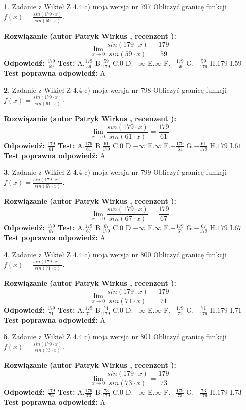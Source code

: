 \documentclass[12pt, a4paper]{article}
\theoremstyle{definition} %
\newtheorem{zad}{}
\newcommand{\zadStart}[1]{\begin{zad}#1\newline}
\newcommand{\zadStop}{\end{zad}}
\newcommand{\rozwStart}[2]{\noindent \textbf{Rozwiązanie (autor #1 , recenzent #2): }\newline}
\newcommand{\rozwStop}{\newline}
\newcommand{\odpStart}{\noindent \textbf{Odpowiedź:}\newline}
\newcommand{\odpStop}{\newline}
\newcommand{\testStart}{\noindent \textbf{Test:}\newline}
\newcommand{\testStop}{\newline}
\newcommand{\kluczStart}{\noindent \textbf{Test poprawna odpowiedź:}\newline}
\newcommand{\kluczStop}{\newline}
\begin{document}
\zadStart{Zadanie z Wikieł Z 4.4 c) moja wersja nr 797}
Obliczyć granicę funkcji $f(x)=\frac{sin(179\cdot x)}{sin(59\cdot x)}$.
\zadStop
\rozwStart{Patryk Wirkus}{}
$$\lim\limits_{x\to 0}\frac{sin(179\cdot x)}{sin(59\cdot x)}=
\frac{179}{59}$$
\rozwStop
\odpStart
$\frac{179}{59}$
\odpStop
\testStart
A.$\frac{179}{59}$
B.$\frac{59}{179}$
C.$0$
D.$-\infty$
E.$\infty$
F.$-\frac{179}{59}$
G.$-\frac{59}{179}$
H.$179$
I.$59$
\testStop
\kluczStart
A
\kluczStop



\zadStart{Zadanie z Wikieł Z 4.4 c) moja wersja nr 798}
Obliczyć granicę funkcji $f(x)=\frac{sin(179\cdot x)}{sin(61\cdot x)}$.
\zadStop
\rozwStart{Patryk Wirkus}{}
$$\lim\limits_{x\to 0}\frac{sin(179\cdot x)}{sin(61\cdot x)}=
\frac{179}{61}$$
\rozwStop
\odpStart
$\frac{179}{61}$
\odpStop
\testStart
A.$\frac{179}{61}$
B.$\frac{61}{179}$
C.$0$
D.$-\infty$
E.$\infty$
F.$-\frac{179}{61}$
G.$-\frac{61}{179}$
H.$179$
I.$61$
\testStop
\kluczStart
A
\kluczStop



\zadStart{Zadanie z Wikieł Z 4.4 c) moja wersja nr 799}
Obliczyć granicę funkcji $f(x)=\frac{sin(179\cdot x)}{sin(67\cdot x)}$.
\zadStop
\rozwStart{Patryk Wirkus}{}
$$\lim\limits_{x\to 0}\frac{sin(179\cdot x)}{sin(67\cdot x)}=
\frac{179}{67}$$
\rozwStop
\odpStart
$\frac{179}{67}$
\odpStop
\testStart
A.$\frac{179}{67}$
B.$\frac{67}{179}$
C.$0$
D.$-\infty$
E.$\infty$
F.$-\frac{179}{67}$
G.$-\frac{67}{179}$
H.$179$
I.$67$
\testStop
\kluczStart
A
\kluczStop



\zadStart{Zadanie z Wikieł Z 4.4 c) moja wersja nr 800}
Obliczyć granicę funkcji $f(x)=\frac{sin(179\cdot x)}{sin(71\cdot x)}$.
\zadStop
\rozwStart{Patryk Wirkus}{}
$$\lim\limits_{x\to 0}\frac{sin(179\cdot x)}{sin(71\cdot x)}=
\frac{179}{71}$$
\rozwStop
\odpStart
$\frac{179}{71}$
\odpStop
\testStart
A.$\frac{179}{71}$
B.$\frac{71}{179}$
C.$0$
D.$-\infty$
E.$\infty$
F.$-\frac{179}{71}$
G.$-\frac{71}{179}$
H.$179$
I.$71$
\testStop
\kluczStart
A
\kluczStop



\zadStart{Zadanie z Wikieł Z 4.4 c) moja wersja nr 801}
Obliczyć granicę funkcji $f(x)=\frac{sin(179\cdot x)}{sin(73\cdot x)}$.
\zadStop
\rozwStart{Patryk Wirkus}{}
$$\lim\limits_{x\to 0}\frac{sin(179\cdot x)}{sin(73\cdot x)}=
\frac{179}{73}$$
\rozwStop
\odpStart
$\frac{179}{73}$
\odpStop
\testStart
A.$\frac{179}{73}$
B.$\frac{73}{179}$
C.$0$
D.$-\infty$
E.$\infty$
F.$-\frac{179}{73}$
G.$-\frac{73}{179}$
H.$179$
I.$73$
\testStop
\kluczStart
A
\kluczStop
\end{document}

